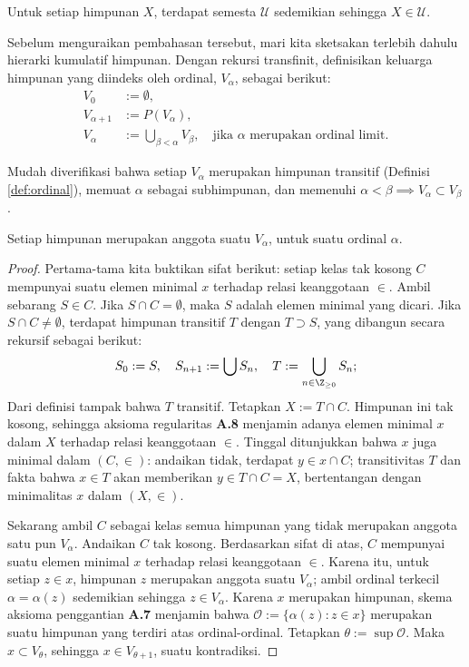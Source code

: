 \begin{hypothesis}[A.\ Grothendieck]\label{hyp:universe}
	Untuk setiap himpunan $X$, terdapat semesta $\mathcal{U}$ sedemikian sehingga $X \in \mathcal{U}$.
\end{hypothesis}

Sebelum menguraikan pembahasan tersebut, mari kita sketsakan terlebih dahulu hierarki kumulatif himpunan. Dengan rekursi transfinit, definisikan keluarga himpunan yang diindeks oleh ordinal, $V_\alpha$, sebagai berikut: 
\begin{align*}
	V_0 & := \emptyset, \\
	V_{\alpha+1} & := P(V_\alpha), \\
	V_\alpha & :=\bigcup_{\beta < \alpha} V_\beta, \quad \text{jika $\alpha$ merupakan ordinal limit}.
\end{align*}

Mudah diverifikasi bahwa setiap $V_\alpha$ merupakan himpunan transitif (Definisi \ref{def:ordinal}), memuat $\alpha$ sebagai subhimpunan, dan memenuhi $\alpha < \beta \implies V_\alpha \subset V_\beta$.

\begin{proposition}
	Setiap himpunan merupakan anggota suatu $V_\alpha$, untuk suatu ordinal $\alpha$.
\end{proposition}
\begin{proof}
	Pertama-tama kita buktikan sifat berikut: setiap kelas tak kosong $C$ mempunyai suatu elemen minimal $x$ terhadap relasi keanggotaan $\in$. Ambil sebarang $S \in C$. Jika $S \cap C = \emptyset$, maka $S$ adalah elemen minimal yang dicari. Jika $S \cap C \neq \emptyset$, terdapat himpunan transitif $T$ dengan $T \supset S$, yang dibangun secara rekursif sebagai berikut:
	\[ S_0 := S, \quad S_{n+1} := \bigcup S_n, \quad T := \bigcup_{n \in \Z_{\geq 0}} S_n; \]
	Dari definisi tampak bahwa $T$ transitif. Tetapkan $X := T \cap C$. Himpunan ini tak kosong, sehingga aksioma regularitas \textbf{A.8} menjamin adanya elemen minimal $x$ dalam $X$ terhadap relasi keanggotaan $\in$. Tinggal ditunjukkan bahwa $x$ juga minimal dalam $(C, \in)$: andaikan tidak, terdapat $y \in x \cap C$; transitivitas $T$ dan fakta bahwa $x \in T$ akan memberikan $y \in T \cap C = X$, bertentangan dengan minimalitas $x$ dalam $(X, \in)$.

	Sekarang ambil $C$ sebagai kelas semua himpunan yang tidak merupakan anggota satu pun $V_\alpha$. Andaikan $C$ tak kosong. Berdasarkan sifat di atas, $C$ mempunyai suatu elemen minimal $x$ terhadap relasi keanggotaan $\in$. Karena itu, untuk setiap $z \in x$, himpunan $z$ merupakan anggota suatu $V_\alpha$; ambil ordinal terkecil $\alpha = \alpha(z)$ sedemikian sehingga $z \in V_\alpha$. Karena $x$ merupakan himpunan, skema aksioma penggantian \textbf{A.7} menjamin bahwa $\mathcal{O} := \{\alpha(z) : z \in x \}$ merupakan suatu himpunan yang terdiri atas ordinal-ordinal. Tetapkan $\theta := \sup \mathcal{O}$. Maka $x \subset V_\theta$, sehingga $x \in V_{\theta+1}$, suatu kontradiksi.
\end{proof}

